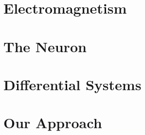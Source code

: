 \documentclass[../Orator.tex]{subfiles}
\begin{document}
\chapter{Electromagnetism}


\chapter{The Neuron}


\chapter{Differential Systems}


\chapter{Our Approach}

\end{document}
